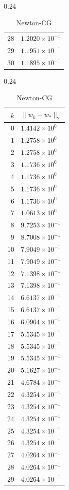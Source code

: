 \documentclass[italian, a4paper, twoside, binding=6mm]{sapthesis}
\begin{document}
\begin{table}[H]
\begin{subtable}{0.24\textwidth}
\begin{tabular}{@{}rl@{}}
28 & $1.2020\times10^{-1}$\\
29 & $1.1951\times10^{-1}$\\
30 & $1.1895\times10^{-1}$\\
\bottomrule
\end{tabular}
\end{subtable}\hfill
\begin{subtable}{0.24\textwidth}
\centering
\caption{Newton-CG}
\begin{tabular}{@{}rl@{}}
\toprule
$k$ & $\|w_k-w_*\|_2$\\
\midrule
0 & $1.4142\times10^{0}$\\
1 & $1.2758\times10^{0}$\\
2 & $1.2758\times10^{0}$\\
3 & $1.1736\times10^{0}$\\
4 & $1.1736\times10^{0}$\\
5 & $1.1736\times10^{0}$\\
6 & $1.1736\times10^{0}$\\
7 & $1.0613\times10^{0}$\\
8 & $9.7253\times10^{-1}$\\
9 & $8.7008\times10^{-1}$\\
10 & $7.9049\times10^{-1}$\\
11 & $7.9049\times10^{-1}$\\
12 & $7.1398\times10^{-1}$\\
13 & $7.1398\times10^{-1}$\\
14 & $6.6137\times10^{-1}$\\
15 & $6.6137\times10^{-1}$\\
16 & $6.0964\times10^{-1}$\\
17 & $5.5345\times10^{-1}$\\
18 & $5.5345\times10^{-1}$\\
19 & $5.5345\times10^{-1}$\\
20 & $5.1627\times10^{-1}$\\
21 & $4.6784\times10^{-1}$\\
22 & $4.3254\times10^{-1}$\\
23 & $4.3254\times10^{-1}$\\
24 & $4.3254\times10^{-1}$\\
25 & $4.3254\times10^{-1}$\\
26 & $4.3254\times10^{-1}$\\
27 & $4.0264\times10^{-1}$\\
28 & $4.0264\times10^{-1}$\\
29 & $4.0264\times10^{-1}$\\

\end{tabular}
\end{subtable}
\end{table}
\end{document}
